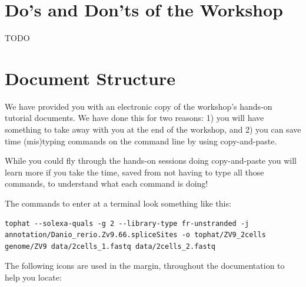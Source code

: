 %
%
\newpage

\section{Do's and Don'ts of the Workshop}
TODO

\section{Document Structure}
We have provided you with an electronic copy of the workshop's hands-on tutorial documents.
We have done this for two reasons: 1) you will have something to take away with you at the 
end of the workshop, and 2) you can save time (mis)typing commands on the command line by using
copy-and-paste.

\begin{warning}
While you could fly through the hands-on sessions doing
copy-and-paste you will learn more if you take the time, saved from not having to type all those
commands, to understand what each command is doing!
\end{warning}

The commands to enter at a terminal look something like this:
\begin{lstlisting}
tophat --solexa-quals -g 2 --library-type fr-unstranded -j annotation/Danio_rerio.Zv9.66.spliceSites -o tophat/ZV9_2cells genome/ZV9 data/2cells_1.fastq data/2cells_2.fastq
\end{lstlisting}  

The following icons are used in the margin, throughout the documentation to help you locate:


